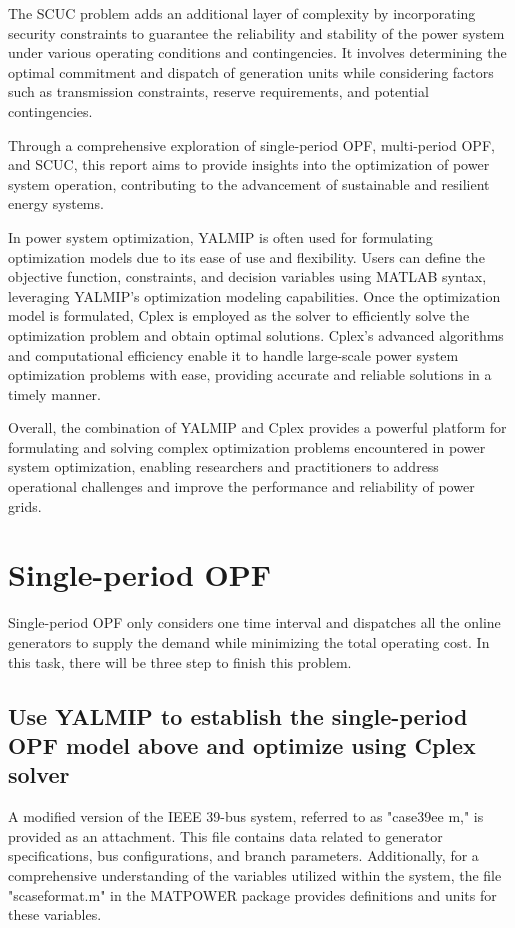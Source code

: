 \documentclass[lettersize,journal]{IEEEtran}
\begin{document}
The SCUC problem adds an additional layer of complexity by incorporating security constraints to guarantee the reliability and stability of the power system under various operating conditions and contingencies. It involves determining the optimal commitment and dispatch of generation units while considering factors such as transmission constraints, reserve requirements, and potential contingencies.

Through a comprehensive exploration of single-period OPF, multi-period OPF, and SCUC, this report aims to provide insights into the optimization of power system operation, contributing to the advancement of sustainable and resilient energy systems.

In power system optimization, YALMIP is often used for formulating optimization models due to its ease of use and flexibility. Users can define the objective function, constraints, and decision variables using MATLAB syntax, leveraging YALMIP's optimization modeling capabilities. Once the optimization model is formulated, Cplex is employed as the solver to efficiently solve the optimization problem and obtain optimal solutions. Cplex's advanced algorithms and computational efficiency enable it to handle large-scale power system optimization problems with ease, providing accurate and reliable solutions in a timely manner.

Overall, the combination of YALMIP and Cplex provides a powerful platform for formulating and solving complex optimization problems encountered in power system optimization, enabling researchers and practitioners to address operational challenges and improve the performance and reliability of power grids.



\section{Single-period OPF}
Single-period OPF only considers one time interval and dispatches all the online generators to supply the demand while minimizing the total operating cost. In this task, there will be three step to finish this problem.

\subsection{Use YALMIP to establish the single-period OPF model above and optimize using Cplex solver}
A modified version of the IEEE 39-bus system, referred to as "case39ee m," is provided as an attachment. This file contains data related to generator specifications, bus configurations, and branch parameters. Additionally, for a comprehensive understanding of the variables utilized within the system, the file "scaseformat.m" in the MATPOWER package provides definitions and units for these variables.
\end{document}
